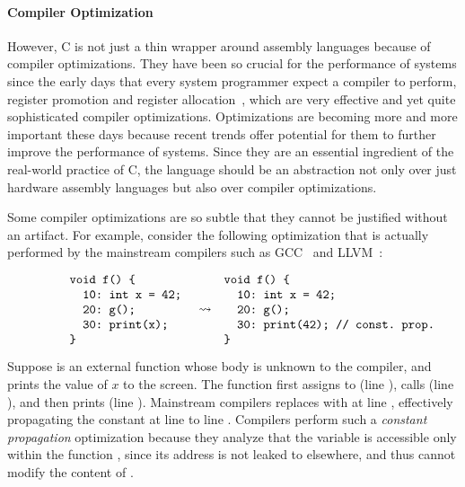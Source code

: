 \paragraph{Compiler Optimization}

However, C is not just a thin wrapper around assembly languages because of compiler optimizations.
They have been so crucial for the performance of systems since the early days that every system
programmer expect a compiler to perform, \eg{} register promotion and register
allocation~\cite{reg-prom, reg-alloc}, which are very effective and yet quite sophisticated compiler
optimizations.  Optimizations are becoming more and more important these days because recent trends
offer potential for them to further improve the performance of systems.  Since they are an essential
ingredient of the real-world practice of C, the language should be an abstraction not only over just
hardware assembly languages but also over compiler optimizations.



Some compiler optimizations are so subtle that they cannot be justified without an artifact.  For
example, consider the following optimization that is actually performed by the mainstream compilers
such as GCC~\cite{gcc} and LLVM~\cite{llvm}:

\[\begin{array}{rcl}
\begin{minipage}{0.27\textwidth}
\begin{verbatim}
void f() {
  10: int x = 42;
  20: g();
  30: print(x);
}
\end{verbatim}
\end{minipage}
&
\optarrow
&
\begin{minipage}{0.4\textwidth}
\begin{verbatim}
void f() {
  10: int x = 42;
  20: g();
  30: print(42); // const. prop.
}
\end{verbatim}
\end{minipage}
\end{array}\]

\noindent Suppose  is an external function whose body is unknown to the compiler, and
 prints the value of $x$ to the screen.  The function  first assigns
 to  (line ), calls  (line ), and then prints 
(line ).  Mainstream compilers replaces  with  at line ,
effectively propagating the constant  at line  to line .  Compilers
perform such a \emph{constant propagation} optimization because they analyze that the variable
 is accessible only within the function , since its address is not leaked to
elsewhere, and thus  cannot modify the content of .


